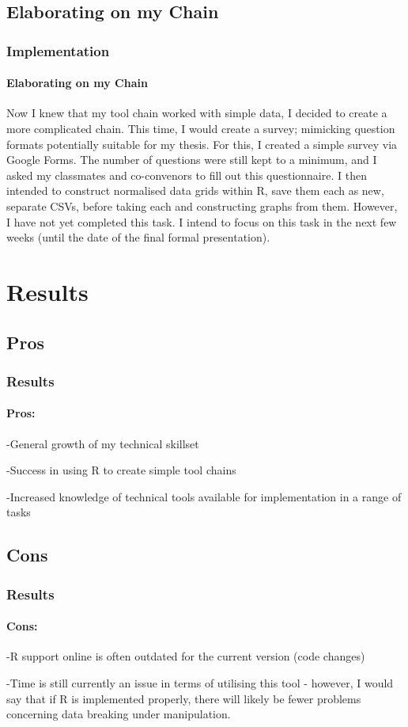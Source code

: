 \documentclass{beamer}
\begin{document}
\subsection{Elaborating on my Chain}
\begin{frame}
\frametitle{Implementation}
\framesubtitle{Elaborating on my Chain}
Now I knew that my tool chain worked with simple data, I decided to create a more complicated chain. This time, I would create a survey; mimicking question formats potentially suitable for my thesis.
\newline
For this, I created a simple survey via Google Forms. The number of questions were still kept to a minimum, and I asked my classmates and co-convenors to fill out this questionnaire. I then intended to construct normalised data grids within R, save them each as new, separate CSVs, before taking each and constructing graphs from them.
\newline
However, I have not yet completed this task. I intend to focus on this task in the next few weeks (until the date of the final formal presentation).
\end{frame}

\section{Results}
\subsection{Pros}
\begin{frame}
\frametitle{Results}
\framesubtitle{Pros:}
\item -General growth of my technical skillset
\item -Success in using R to create simple tool chains
\item -Increased knowledge of technical tools available for implementation in a range of tasks
\end{frame}

\subsection{Cons}
\begin{frame}
\frametitle{Results}
\framesubtitle{Cons:}
\item -R support online is often outdated for the current version (code changes)
\item -Time is still currently an issue in terms of utilising this tool - however, I would say that if R is implemented properly, there will likely be fewer problems concerning data breaking under manipulation. 
\end{frame}
\end{document}
